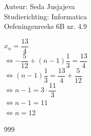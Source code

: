 \documentclass[a4paper]{article}
\begin{document}
\noindent \large Auteur: Seda Jusjajeva\\
\noindent \large Studierichting: Informatica\\
\noindent \large Oefeningenreeks 6B nr. 4.9\\

\medskip

\normalsize


$x_n = \dfrac{13}{4}$ \\

$\Leftrightarrow -\dfrac{5}{12} + (n - 1)\dfrac{1}{3} = \dfrac{13}{4}$ \\

$\Leftrightarrow (n - 1)\dfrac{1}{3} = \dfrac{13}{4} + \dfrac{5}{12}$ \\

$\Leftrightarrow n - 1 = 3\cdot\dfrac{11}{3}$ \\

$\Leftrightarrow n - 1 = 11$ \\

$\Leftrightarrow n = 12$ \\





\begin{thebibliography}{999}
\end{thebibliography}
\end{document}

